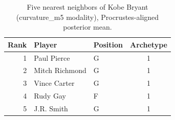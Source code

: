 \begin{table}[htbp]
  \centering\small
  \begin{tabular}{rllc}
    \toprule
    Rank & Player & Position & Archetype \\
    \midrule
    1 & Paul Pierce & G & 1 \\
    2 & Mitch Richmond & G & 1 \\
    3 & Vince Carter & G & 1 \\
    4 & Rudy Gay & F & 1 \\
    5 & J.R. Smith & G & 1 \\
    \bottomrule
  \end{tabular}
  \caption{Five nearest neighbors of Kobe Bryant (curvature_m5 modality), Procrustes-aligned posterior mean.}
  \label{tab:Kobe_Bryant_neighbors_curvature_m5}
\end{table}

